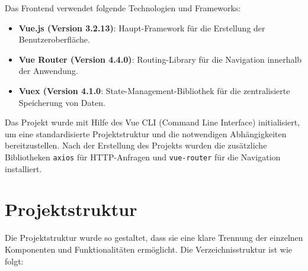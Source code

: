 Das Frontend verwendet folgende Technologien und Frameworks:

\begin{itemize}
	\item \textbf{Vue.js (Version 3.2.13)}: Haupt-Framework für die Erstellung der Benutzeroberfläche.
	\item \textbf{Vue Router (Version 4.4.0)}:  Routing-Library für die Navigation innerhalb der Anwendung.
	\item \textbf{Vuex (Version 4.1.0}: State-Management-Bibliothek für die zentralisierte Speicherung von Daten.
\end{itemize}

Das Projekt wurde mit Hilfe des Vue CLI (Command Line Interface) initialisiert, um eine standardisierte Projektstruktur und die notwendigen Abhängigkeiten bereitzustellen. Nach der Erstellung des Projekts wurden die zusätzliche Bibliotheken \texttt{axios} für HTTP-Anfragen und \texttt{vue-router} für die Navigation installiert.


\section{Projektstruktur}
Die Projektstruktur wurde so gestaltet, dass sie eine klare Trennung der einzelnen Komponenten und Funktionalitäten ermöglicht. Die Verzeichnisstruktur ist wie folgt:

